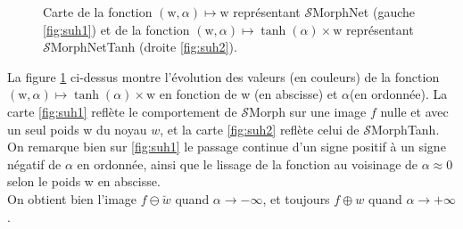 \vspace{-1.5mm}
\begin{figure}[ht]
  \begin{center}
      \hspace{12.0mm}
    \caption{ \centering Carte de la fonction $(\text{w},\alpha) \mapsto \text{w}$ représentant $\mathcal{S}$MorphNet (gauche \ref{fig:suh1}) et de la fonction $(\text{w},\alpha) \mapsto \tanh{(\alpha)} \times \text{w}$ représentant $\mathcal{S}$MorphNetTanh (droite \ref{fig:suh2}).}
    \label{fig:espace_s_vs_sh}
  \end{center}
\end{figure}

\vspace{-4.0mm}
\noindent La figure \ref{fig:espace_s_vs_sh} ci-dessus montre l'évolution des valeurs (en couleurs) de la fonction $(\text{w},\alpha) \mapsto \tanh{(\alpha)} \times \text{w}$ en fonction de w (en abscisse) et $\alpha$(en ordonnée). La carte \ref{fig:suh1} reflète le comportement de $\mathcal{S}$Morph sur une image $f$ nulle et avec un seul poids w du noyau $w$, et la carte \ref{fig:suh2} reflète celui de $\mathcal{S}$MorphTanh. On remarque bien sur \ref{fig:suh1} le passage continue d'un signe positif à un signe négatif de $\alpha$ en ordonnée, ainsi que le lissage de la fonction au voisinage de $\alpha \approx 0$ selon le poids w en abscisse. \\

\vspace{-1.6mm}
\noindent On obtient bien l'image $f \ominus \breve{w}$ quand $\alpha \rightarrow -\infty$, et toujours $f \oplus w$ quand $\alpha \rightarrow +\infty$.
